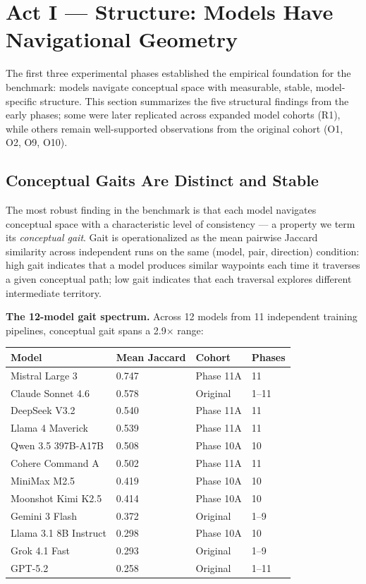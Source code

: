 \section{Act I --- Structure: Models Have Navigational Geometry}\label{act-i-structure-models-have-navigational-geometry}

The first three experimental phases established the empirical foundation for the benchmark: models navigate conceptual space with measurable, stable, model-specific structure. This section summarizes the five structural findings from the early phases; some were later replicated across expanded model cohorts (R1), while others remain well-supported observations from the original cohort (O1, O2, O9, O10).

\subsection{Conceptual Gaits Are Distinct and Stable}\label{conceptual-gaits-are-distinct-and-stable}

The most robust finding in the benchmark is that each model navigates conceptual space with a characteristic level of consistency --- a property we term its \emph{conceptual gait}. Gait is operationalized as the mean pairwise Jaccard similarity across independent runs on the same (model, pair, direction) condition: high gait indicates that a model produces similar waypoints each time it traverses a given conceptual path; low gait indicates that each traversal explores different intermediate territory.

\textbf{The 12-model gait spectrum.} Across 12 models from 11 independent training pipelines, conceptual gait spans a 2.9× range:

\begin{longtable}[]{@{}llll@{}}
\toprule\noalign{}
Model & Mean Jaccard & Cohort & Phases \\
\midrule\noalign{}
\endhead
\bottomrule\noalign{}
\endlastfoot
Mistral Large 3 & 0.747 & Phase 11A & 11 \\
Claude Sonnet 4.6 & 0.578 & Original & 1--11 \\
DeepSeek V3.2 & 0.540 & Phase 11A & 11 \\
Llama 4 Maverick & 0.539 & Phase 11A & 11 \\
Qwen 3.5 397B-A17B & 0.508 & Phase 10A & 10 \\
Cohere Command A & 0.502 & Phase 11A & 11 \\
MiniMax M2.5 & 0.419 & Phase 10A & 10 \\
Moonshot Kimi K2.5 & 0.414 & Phase 10A & 10 \\
Gemini 3 Flash & 0.372 & Original & 1--9 \\
Llama 3.1 8B Instruct & 0.298 & Phase 10A & 10 \\
Grok 4.1 Fast & 0.293 & Original & 1--9 \\
GPT-5.2 & 0.258 & Original & 1--11 \\
\end{longtable}

